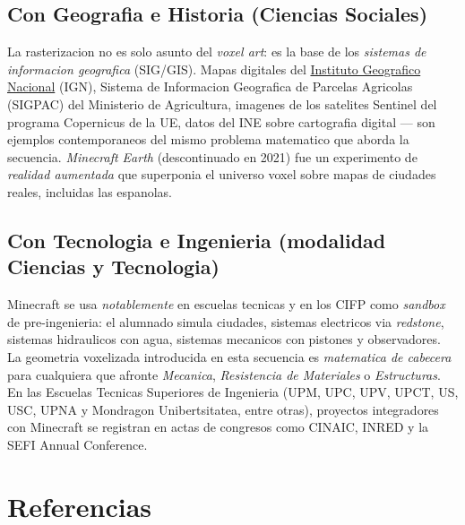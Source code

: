 \documentclass[12pt,a4paper]{scrartcl}
\begin{document}
\subsection{Con Geografia e Historia (Ciencias Sociales)}
La rasterizacion no es solo asunto del \emph{voxel art}: es la base de los \emph{sistemas de informacion geografica} (SIG/GIS). Mapas digitales del \href{https://www.ign.es/}{Instituto Geografico Nacional} (IGN), Sistema de Informacion Geografica de Parcelas Agricolas (SIGPAC) del Ministerio de Agricultura, imagenes de los satelites Sentinel del programa Copernicus de la UE, datos del INE sobre cartografia digital --- son ejemplos contemporaneos del mismo problema matematico que aborda la secuencia. \emph{Minecraft Earth} (descontinuado en 2021) fue un experimento de \emph{realidad aumentada} que superponia el universo voxel sobre mapas de ciudades reales, incluidas las espanolas.

\subsection{Con Tecnologia e Ingenieria (modalidad Ciencias y Tecnologia)}
Minecraft se usa \emph{notablemente} en escuelas tecnicas y en los CIFP como \emph{sandbox} de pre-ingenieria: el alumnado simula ciudades, sistemas electricos via \emph{redstone}, sistemas hidraulicos con agua, sistemas mecanicos con pistones y observadores. La geometria voxelizada introducida en esta secuencia es \emph{matematica de cabecera} para cualquiera que afronte \emph{Mecanica}, \emph{Resistencia de Materiales} o \emph{Estructuras}. En las Escuelas Tecnicas Superiores de Ingenieria (UPM, UPC, UPV, UPCT, US, USC, UPNA y Mondragon Unibertsitatea, entre otras), proyectos integradores con Minecraft se registran en actas de congresos como CINAIC, INRED y la SEFI Annual Conference.

\section{Referencias}\label{sec:referencias}
\end{document}
